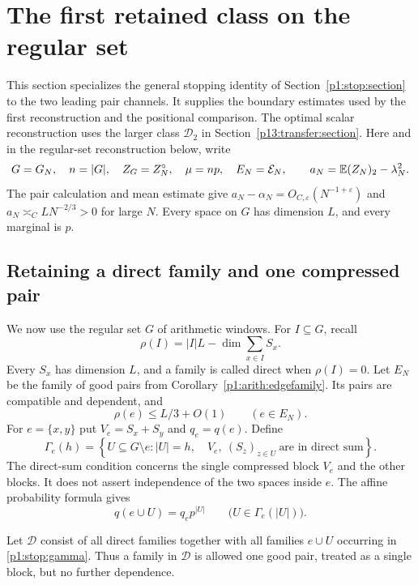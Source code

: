 \section{The first retained class on the regular set}
\label{p14:comp:stopped}

This section specializes the general stopping identity of
Section~\ref{p1:stop:section} to the two leading pair channels. It
supplies the boundary estimates used by the first reconstruction and
the positional comparison. The optimal scalar reconstruction uses the
larger class $\mathscr D_2$ in Section~\ref{p13:transfer:section}.
Here and in the regular-set reconstruction below, write
\[
 G=G_N,\quad n=|G|,\quad Z_G=Z_N^\circ,\quad
 \mu=np,\quad E_N=\mathcal E_N,
 \qquad a_N=\mathbb E(Z_N)_2-\lambda_N^2.
\]
The pair calculation and mean estimate give
$a_N-\alpha_N=O_{C,\varepsilon}(N^{-1+\varepsilon})$ and
$a_N\asymp_C LN^{-2/3}>0$ for large $N$.
Every space on $G$ has dimension $L$, and every marginal is $p$.

\subsection{Retaining a direct family and one compressed pair}

We now use the regular set $G$ of arithmetic windows.
For $I\subseteq G$, recall
\[
 \rho(I)=|I|L-\dim\sum_{x\in I}S_x.
\]
Every $S_x$ has dimension $L$, and a family is called direct
when $\rho(I)=0$.  Let $E_N$ be the family of good pairs
from Corollary~\ref{p1:arith:edgefamily}.  Its pairs are
compatible and dependent, and
\begin{equation}
 \rho(e)\le L/3+O(1)\qquad(e\in E_N).
 \label{p1:stop:pair-nullity}
\end{equation}
For $e=\{x,y\}$ put $V_e=S_x+S_y$ and $q_e=q(e)$.  Define
\begin{equation}
 \Gamma_e(h)=\left\{
 U\subseteq G\setminus e:|U|=h,\quad
 V_e,\ (S_z)_{z\in U}\ \text{are in direct sum}
                    \right\}.
 \label{p1:stop:gamma}
\end{equation}
The direct-sum condition concerns the single compressed block
$V_e$ and the other blocks.  It does not assert independence
of the two spaces inside $e$.  The affine probability formula
gives
\begin{equation}
 q(e\cup U)=q_ep^{|U|}
              \qquad\bigl(U\in\Gamma_e(|U|)\bigr).
 \label{p1:stop:direct-pair-probability}
\end{equation}

Let $\mathscr D$ consist of all direct families together with
all families $e\cup U$ occurring in
\eqref{p1:stop:gamma}.  Thus a family in $\mathscr D$ is allowed
one good pair, treated as a single block, but no further dependence.

